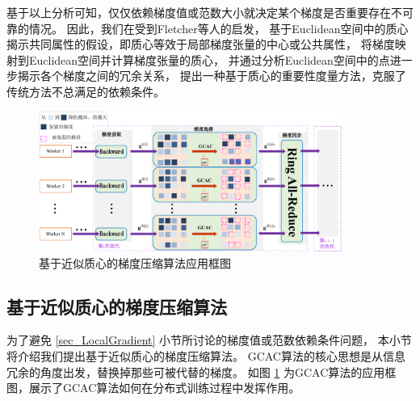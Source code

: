 \documentclass{xdupgthesis}
\begin{document}
基于以上分析可知，仅仅依赖梯度值或范数大小就决定某个梯度是否重要存在不可靠的情况。
因此，我们在受到Fletcher等人\cite{fletcher2008robust}的启发，
基于Euclidean空间中的质心揭示共同属性的假设，即质心等效于局部梯度张量的中心或公共属性，
将梯度映射到Euclidean空间并计算梯度张量的质心，
并通过分析Euclidean空间中的点进一步揭示各个梯度之间的冗余关系，
提出一种基于质心的重要性度量方法，克服了传统方法不总满足的依赖条件。

\begin{figure}[ht]
    \centering
    \includegraphics[width=0.884\textwidth]{GCC-Outline.pdf}
    \caption{基于近似质心的梯度压缩算法应用框图}
    \label{fig_GCC-Outline}
\end{figure}
\subsection{基于近似质心的梯度压缩算法}
\label{chapter3-2-2}
为了避免 \ref{sec_LocalGradient} 小节所讨论的梯度值或范数依赖条件问题，
本小节将介绍我们提出基于近似质心的梯度压缩算法。
GCAC算法的核心思想是从信息冗余的角度出发，替换掉那些可被代替的梯度。
如图 \ref{fig_GCC-Outline} 为GCAC算法的应用框图，展示了GCAC算法如何在分布式训练过程中发挥作用。
\end{document}
